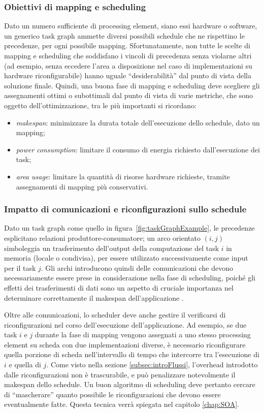 \subsubsection{Obiettivi di mapping e scheduling}
Dato un numero sufficiente di processing element, siano essi hardware o software, un generico
task graph ammette diversi possibili schedule che ne rispettino le 
precedenze, per ogni possibile mapping. Sfortunatamente, non tutte le scelte di mapping e scheduling
che soddisfano i vincoli di precedenza senza violarne altri (ad esempio, senza eccedere l'area a disposizione
nel caso di implementazioni su hardware riconfigurabile)
hanno uguale ``desiderabilità'' dal punto di vista della soluzione finale. Quindi, una buona fase
di mapping e scheduling deve scegliere gli assegnamenti ottimi o subottimali dal punto di vista di
varie metriche, che sono oggetto dell'ottimizzazione, tra le più importanti si ricordano:
\begin{itemize}
 \item \emph{makespan}: minimizzare la durata totale dell'esecuzione dello schedule, dato un mapping;
 \item \emph{power consumption}: limitare il consumo di energia richiesto 
    dall'esecuzione dei task;
  \item \emph{area usage}: limitare la quantit\`a di risorse hardware richieste,
    tramite assegnamenti di mapping pi\`u conservativi.
\end{itemize}


\subsubsection{Impatto di comunicazioni e riconfigurazioni sullo schedule}
Dato un task graph come quello in figura~\ref{fig:taskGraphExample},
le precedenze esplicitano relazioni produttore-consumatore;
un arco orientato $(i,j)$ simboleggia un trasferimento dell'output della
computazione del task $i$ in memoria (locale o condivisa), per essere utilizzato
successivamente come input per il task $j$.
Gli archi introducono quindi delle
comunicazioni che devono necessariamente essere prese in considerazione nella fase 
di scheduling, poich\'e gli effetti dei trasferimenti di dati sono un aspetto
di cruciale importanza nel determinare correttamente il makespan dell'applicazione \cite{AntColonyOptimization}.

Oltre alle comunicazioni, lo scheduler deve anche gestire il verificarsi di 
riconfigurazioni nel corso dell'esecuzione dell'applicazione. Ad esempio, se due task $i$ 
e $j$ durante la fase di mapping vengono assegnati a uno stesso processing element su 
scheda con due implementazioni diverse, è necessario riconfigurare quella porzione di 
scheda nell'intervallo di tempo che intercorre tra l'esecuzione di $i$ e quella di $j$.
Come visto nella sezione \ref{subsec:introFlussi}, l'overhead introdotto dalle riconfigurazioni
non \`e trascurabile, e pu\`o penalizzare notevolmente il makespan dello schedule.
Un buon algoritmo di scheduling deve pertanto cercare di ``mascherare'' quanto possibile le
riconfigurazioni che devono essere eventualmente fatte. Questa tecnica verr\`a spiegata nel capitolo
\ref{chap:SOA}.

